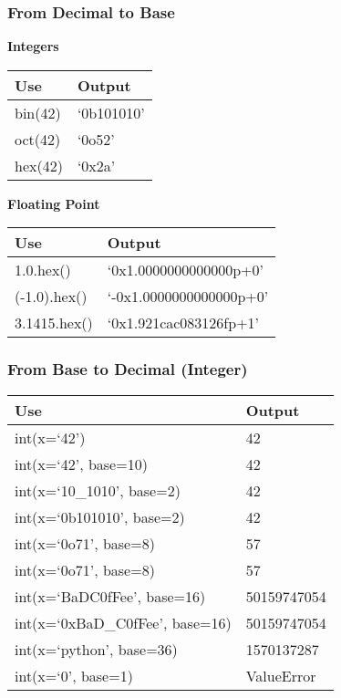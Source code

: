 \documentclass{beamer}
\begin{document}
\begin{frame}
  \frametitle{From Decimal to Base}
  \textbf{Integers}
  \begin{table}
    \begin{tabular}{l | l}
    Use         & Output   \\
    \hline
    bin(42)     & `0b101010' \\
    oct(42)     & `0o52'     \\
    hex(42)     & `0x2a'     \\
    \end{tabular}
  \end{table}

  \textbf{Floating Point}
  \begin{table}
    \begin{tabular}{l | l}
    Use          & Output   \\
    \hline
    1.0.hex()    & `0x1.0000000000000p+0'  \\
    (-1.0).hex() & `-0x1.0000000000000p+0' \\
    3.1415.hex() & `0x1.921cac083126fp+1'
    \end{tabular}
  \end{table}
\end{frame}


\begin{frame}
  \frametitle{From Base to Decimal (Integer)}
  
  \begin{table}
    \begin{tabular}{l | l }
      Use                     & Output   \\
      \hline
      int(x=`42')          & 42          \\
      int(x=`42', base=10) & 42          \\
      \hline
      int(x=`10\_1010', base=2) & 42     \\
      int(x=`0b101010', base=2) & 42     \\
      \hline
      int(x=`0o71', base=8) & 57         \\
      int(x=`0o71', base=8) & 57         \\
      \hline
      int(x=`BaDC0fFee', base=16) & 50159747054\\
      int(x=`0xBaD\_C0fFee', base=16) & 50159747054\\
      \hline
      int(x=`python', base=36) & 1570137287\\
      int(x=`0', base=1) & ValueError \\
      \end{tabular}
  \end{table}
\end{frame}
\end{document}
